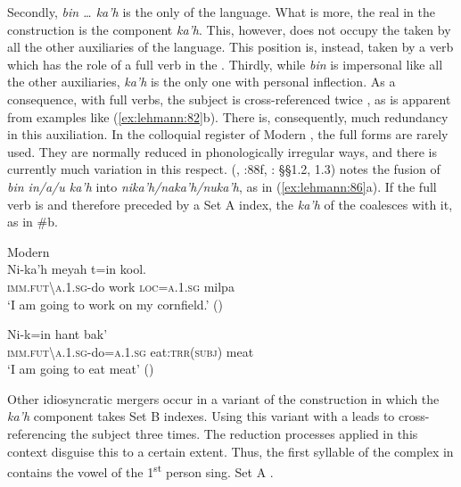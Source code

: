 \documentclass[output=paper]{langsci/langscibook}
\begin{document}
Secondly, \textit{bin … ka’h} is the only  of the language. What is more, the real  in the construction is the component \textit{ka’h}. This, however, does not occupy the  taken by all the other auxiliaries of the language. This position is, instead, taken by a verb which has the role of a full verb in the . Thirdly, while \textit{bin} is impersonal like all the other auxiliaries, \textit{ka’h} is the only one with personal inflection. As a consequence, with  full verbs, the subject is cross-referenced twice \citep[82]{BriceñoChel1998}, as is apparent from examples like (\ref{ex:lehmann:82}b). There is, consequently, much redundancy in this auxiliation. In the colloquial register of Modern , the full forms are rarely used. They are normally reduced in phonologically irregular ways, and there is currently much variation in this respect. \citeauthor{BriceñoChel1998} (\citeyear[82]{BriceñoChel1998}, \citeyear{BriceñoChel2000ir}:88f, \citeyear{BriceñoChel2006}: §§1.2, 1.3) notes the fusion of \textit{bin in/a/u ka’h} into \textit{nika’h/naka’h/nuka’h}, as in (\ref{ex:lehmann:86}a). If the full verb is  and therefore preceded by a Set A index, the \textit{ka’h} of the  coalesces with it, as in \#b.

\ea\label{ex:lehmann:86}
Modern  \\
\ea
\gll  Ni-ka’h          meyah    t=in        kool.\\
  \textsc{imm.fut{\textbackslash}a.1.sg-}do  work      \textsc{loc=a.1.sg}  milpa\\
\glt ‘I am going to work on my cornfield.’ (\citealt[88]{BriceñoChel2000ir})

\ex
\gll   Ni-k=in                hant          bak’\\
\textsc{imm.fut{\textbackslash}a.1.sg}{}-do=\textsc{a.1.sg}  eat:\textsc{trr(subj)}  meat\\
\glt ‘I am going to eat meat’ (\citealt[99]{BriceñoChel2000ir})
\z
\z

Other idiosyncratic mergers occur in a variant of the construction in which the \textit{ka’h} component takes Set B indexes. Using this variant with a  leads to cross-referencing the subject three times. The reduction processes applied in this context disguise this to a certain extent. Thus, the first syllable of the complex  in  contains the vowel of the 1\textsuperscript{st} person sing. Set A .
\end{document}
